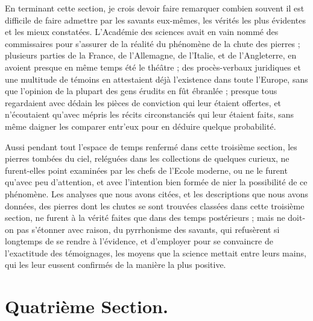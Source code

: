 \documentclass[a4paper, 12pt, oneside, french]{article}
\begin{document}
En terminant cette section, je crois devoir faire remarquer combien souvent il est difficile de faire admettre par les savants eux-mêmes, les vérités les plus évidentes et les mieux constatées. L'Académie des sciences avait en vain nommé des commissaires pour s'assurer de la réalité du phénomène de la chute des pierres ; plusieurs parties de la France, de l'Allemagne, de l'Italie, et de l'Angleterre, en avoient presque en même temps été le théâtre ; des procès-verbaux juridiques et une multitude de témoins en attestaient déjà l'existence dans toute l'Europe, sans que l'opinion de la plupart des gens érudits en fût ébranlée ; presque tous regardaient avec dédain les pièces de conviction qui leur étaient offertes, et n'écoutaient qu'avec mépris les récits circonstanciés qui leur étaient faits, sans même daigner les comparer entr'eux pour en déduire quelque probabilité.

Aussi pendant tout l'espace de temps renfermé dans cette troisième section, les pierres tombées du ciel, reléguées dans les collections de quelques curieux, ne furent-elles point examinées par les chefs de l'Ecole moderne, ou ne le furent qu'avec peu d'attention, et avec l'intention bien formée de nier la possibilité de ce phénomène. Les analyses que nous avons citées, et les descriptions que nous avons données, des pierres dont les chutes se sont trouvées classées dans cette troisième section, ne furent à la vérité faites que dans des temps postérieurs ; mais ne doit-on pas s'étonner avec raison, du pyrrhonisme des savants, qui refusèrent si longtemps de se rendre à l'évidence, et d'employer pour se convaincre de l'exactitude des témoignages, les moyens que la science mettait entre leurs mains, qui les leur eussent confirmés de la manière la plus positive.
\clearpage
\section{Quatrième Section.}
\end{document}
